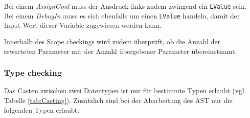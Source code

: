 \documentclass[10pt, a4paper, twocolumn]{article} %
\begin{document}
\begin{table}[h]
    \centering
    \tiny
    \caption{LRValue-Kombinationen}
    \label{tab:lrvalues}
\end{table}
Bei einem \textit{AssignCmd} muss der Ausdruck links zudem zwingend ein \texttt{LValue} sein.
Bei einem \textit{DebugIn} muss es sich ebenfalls um einen \texttt{LValue} handeln, damit der Input-Wert dieser Variable zugewiesen werden kann.

Innerhalb des Scope checkings wird zudem überprüft, ob die Anzahl der erwarteten Parameter mit der Anzahl übergebener Parameter übereinstimmt.

\subsubsection*{Type checking}
Das Casten zwischen zwei Datentypen ist nur für bestimmte Typen erlaubt (vgl. Tabelle \ref{tab:Casting}).
Zusätzlich sind bei der Abarbeitung des AST nur die folgenden Typen erlaubt:
\end{document}
